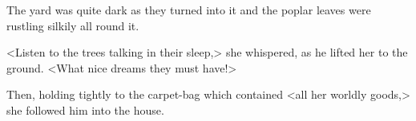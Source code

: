 The yard was quite dark as they turned into it and the poplar leaves were rustling silkily all round it.

<Listen to the trees talking in their sleep,> she whispered, as he lifted her to the ground. <What nice dreams they must have!>

Then, holding tightly to the carpet-bag which contained <all her worldly goods,> she followed him into the house.